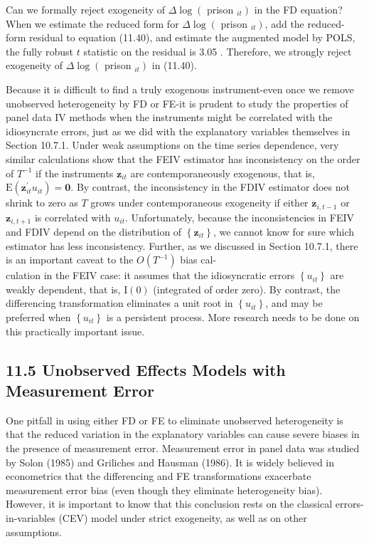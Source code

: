 \documentclass[10pt]{article}
\begin{document}
Can we formally reject exogeneity of $\Delta \log \left(\right.$ prison $\left._{i t}\right)$ in the FD equation? When we estimate the reduced form for $\Delta \log \left(\right.$ prison $\left._{i t}\right)$, add the reduced-form residual to equation (11.40), and estimate the augmented model by POLS, the fully robust $t$ statistic on the residual is 3.05 . Therefore, we strongly reject exogeneity of $\Delta \log \left(\right.$ prison $\left._{i t}\right)$ in (11.40).

Because it is difficult to find a truly exogenous instrument-even once we remove unobserved heterogeneity by FD or FE-it is prudent to study the properties of panel data IV methods when the instruments might be correlated with the idiosyncrate errors, just as we did with the explanatory variables themselves in Section 10.7.1. Under weak assumptions on the time series dependence, very similar calculations show that the FEIV estimator has inconsistency on the order of $T^{-1}$ if the instruments $\mathbf{z}_{i t}$ are contemporaneously exogenous, that is, $\mathrm{E}\left(\mathbf{z}_{i t}^{\prime} u_{i t}\right)=\mathbf{0}$. By contrast, the inconsistency in the FDIV estimator does not shrink to zero as $T$ grows under contemporaneous exogeneity if either $\mathbf{z}_{i, t-1}$ or $\mathbf{z}_{i, t+1}$ is correlated with $u_{i t}$. Unfortunately, because the inconsistencies in FEIV and FDIV depend on the distribution of $\left\{\mathbf{z}_{i t}\right\}$, we cannot know for sure which estimator has less inconsistency. Further, as we discussed in Section 10.7.1, there is an important caveat to the $O\left(T^{-1}\right)$ bias cal-\\
culation in the FEIV case: it assumes that the idiosyncratic errors $\left\{u_{i t}\right\}$ are weakly dependent, that is, $\mathrm{I}(0)$ (integrated of order zero). By contrast, the differencing transformation eliminates a unit root in $\left\{u_{i t}\right\}$, and may be preferred when $\left\{u_{i t}\right\}$ is a persistent process. More research needs to be done on this practically important issue.

\subsection*{11.5 Unobserved Effects Models with Measurement Error}
One pitfall in using either FD or FE to eliminate unobserved heterogeneity is that the reduced variation in the explanatory variables can cause severe biases in the presence of measurement error. Measurement error in panel data was studied by Solon (1985) and Griliches and Hausman (1986). It is widely believed in econometrics that the differencing and FE transformations exacerbate measurement error bias (even though they eliminate heterogeneity bias). However, it is important to know that this conclusion rests on the classical errors-in-variables (CEV) model under strict exogeneity, as well as on other assumptions.
\end{document}
